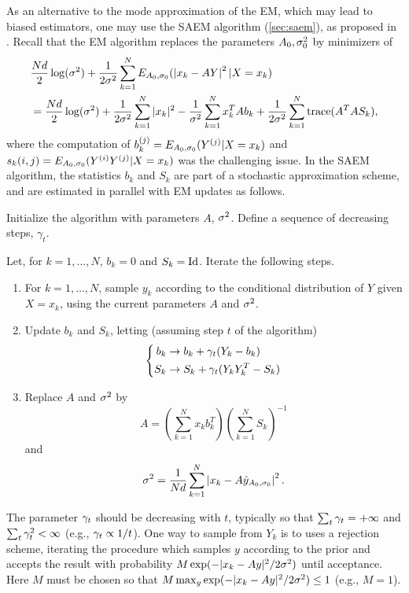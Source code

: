 As an alternative to the mode approximation of the EM,  which may lead to biased estimators, one may use the SAEM algorithm (\cref{sec:saem}), as proposed in \citet{allassonniere2012stochastic}. Recall that the EM algorithm replaces the parameters $A_0, \sigma_0^2$ by minimizers of 
\begin{align*}
&\frac{Nd}{2}\log (\sigma^2)  + \frac{1}{2\sigma^2} \sum_{k=1}^N E_{A_0,
\sigma_0}( \left| x_k- AY \right|^2 | X=x_k) \\
&= \frac{Nd}{2}\log (\sigma^2) + \frac{1}{2\sigma^2} \sum_{k=1}^N |x_k|^2 - \frac{1}{\sigma^2} \sum_{k=1}^N x_k^T Ab_k + \frac{1}{2\sigma^2} \sum_{k=1}^N {\mathrm{trace}}(A^TAS_k),
\end{align*}
where the computation of $b_{k}^{(j)} = E_{A_0, \sigma_0}(Y^{(j)} | X=x_k)$ and $s_k(i,j) = E_{A_0,\sigma_0}(Y^{(i)}Y^{(j)}|X=x_k)$ was the challenging issue. In the SAEM algorithm, the statistics $b_k$ and $S_k$ are part of a stochastic approximation scheme, and are estimated in parallel with EM updates as follows.
\begin{algorithm}
Initialize the algorithm with parameters $A$, $\sigma^2$. Define a sequence of decreasing steps, $\gamma_t$.

Let, for $k=1, \ldots, N$, $b_k = 0$ and $S_k = \Id$. Iterate the following steps.
\begin{enumerate}
\item For $k=1, \ldots, N$, sample $y_k$ according to the conditional distribution of $Y$ given $X=x_k$, using the current parameters $A$ and $\sigma^2$.
\item Update $b_k$ and $S_k$, letting (assuming step $t$ of the algorithm)
\[
\left\{
\begin{aligned}
b_k &\to b_k +  \gamma_{t} (Y_k - b_k)\\
S_k &\to S_k +  \gamma_{t} (Y_kY_k^T - S_k)
\end{aligned}
\right.
\]
\item Replace $A$ and $\sigma^2$ by
\[
A = \left(\sum_{k=1}^N x_k b_k^T\right)\left(\sum_{k=1}^N S_k\right)^{-1} 
\]
and 
\[
\sigma^2 = \frac{1}{Nd} \sum_{k=1}^N \left| x_k- A\hat y_{A_0, \sigma_0} \right|^2.
\]
\end{enumerate}
\end{algorithm}

The parameter $\gamma_t$ should be decreasing with $t$, typically so that $\sum_t \gamma_t = +\infty$ and $\sum_t\gamma_t^2 < \infty$ (e.g., $\gamma_t \propto 1/t$). One way to sample from $Y_k$ is to uses a rejection scheme, iterating the procedure which samples $y$ according to the prior and accepts the result with probability  $M\exp(- |x_k - Ay|^2/2\sigma^2)$ until acceptance. Here $M$ must be chosen so that
$M \max_y \exp(- |x_k - Ay|^2/2\sigma^2) \leq 1$ (e.g., $M=1$). 


